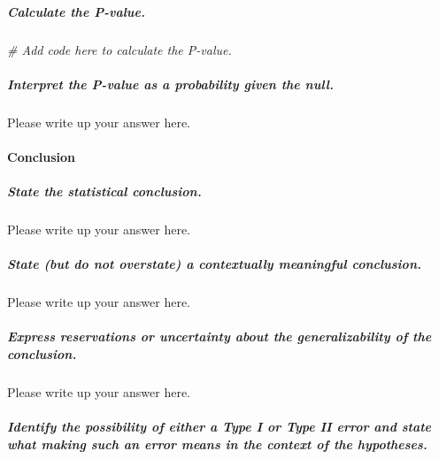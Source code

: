 \documentclass[
]{book}
\newenvironment{Shaded}{\begin{snugshade}}{\end{snugshade}}
\newcommand{\CommentTok}[1]{\textcolor[rgb]{0.56,0.35,0.01}{\textit{#1}}}
\begin{document}
\hypertarget{calculate-the-p-value.-1}{%
\subparagraph*{Calculate the P-value.}\label{calculate-the-p-value.-1}}

\begin{Shaded}
\begin{Highlighting}[]
\CommentTok{\# Add code here to calculate the P{-}value.}
\end{Highlighting}
\end{Shaded}

\hypertarget{interpret-the-p-value-as-a-probability-given-the-null.-1}{%
\subparagraph*{Interpret the P-value as a probability given the null.}\label{interpret-the-p-value-as-a-probability-given-the-null.-1}}

Please write up your answer here.

\hypertarget{conclusion-1}{%
\paragraph*{Conclusion}\label{conclusion-1}}

\hypertarget{state-the-statistical-conclusion.-1}{%
\subparagraph*{State the statistical conclusion.}\label{state-the-statistical-conclusion.-1}}

Please write up your answer here.

\hypertarget{state-but-do-not-overstate-a-contextually-meaningful-conclusion.-1}{%
\subparagraph*{State (but do not overstate) a contextually meaningful conclusion.}\label{state-but-do-not-overstate-a-contextually-meaningful-conclusion.-1}}

Please write up your answer here.

\hypertarget{express-reservations-or-uncertainty-about-the-generalizability-of-the-conclusion.-1}{%
\subparagraph*{Express reservations or uncertainty about the generalizability of the conclusion.}\label{express-reservations-or-uncertainty-about-the-generalizability-of-the-conclusion.-1}}

Please write up your answer here.

\hypertarget{identify-the-possibility-of-either-a-type-i-or-type-ii-error-and-state-what-making-such-an-error-means-in-the-context-of-the-hypotheses.-1}{%
\subparagraph*{Identify the possibility of either a Type I or Type II error and state what making such an error means in the context of the hypotheses.}\label{identify-the-possibility-of-either-a-type-i-or-type-ii-error-and-state-what-making-such-an-error-means-in-the-context-of-the-hypotheses.-1}}
\end{document}

